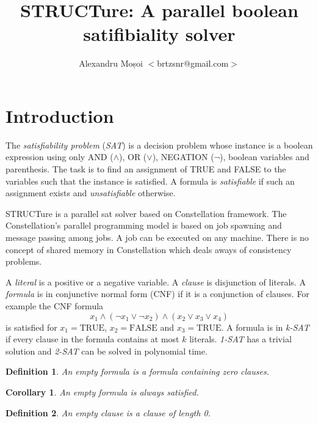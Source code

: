 \documentclass[12pt]{article}
\newtheorem{definition}{Definition}
\newtheorem{corollary}{Corollary}
\newcommand{\T}{\text{TRUE}}
\newcommand{\F}{\text{FALSE}}
\begin{document}
\title{STRUCTure: A parallel boolean satifibiality solver}
\author{Alexandru Moșoi $<$brtzsnr@gmail.com$>$}
\maketitle

\begin{abstract}
\end{abstract}

\section{Introduction}

The \emph{satisfiability problem} (\emph{SAT}) is a decision problem whose instance is a boolean
expression using only AND ($\land$), OR ($\lor$), NEGATION ($\neg$), boolean variables and
parenthesis. The task is to find an assignment of TRUE and FALSE to the variables such that
the instance is satisfied. A formula is \emph{satisfiable} if such an assignment exists and
\emph{unsatisfiable} otherwise.

STRUCTure is a parallel sat solver based on Constellation framework. The Constellation's
parallel programming model is based on job spawning and message passing among jobs.  A job can
be executed on any machine. There is no concept of shared memory in Constellation which deals
aways of consistency problems.

A \emph{literal} is a positive or a negative variable. A \emph{clause} is disjunction of literals.
A \emph{formula} is in conjunctive normal form (CNF) if it is a conjunction of clauses. For
example the CNF formula
\[
x_1 \land (\neg x_1 \lor \neg x_2) \land (x_2 \lor x_3 \lor x_4)
\]
is satisfied for $x_1 = \T$, $x_2 = \F$ and $x_3 = \text{TRUE}$. A formula is in \emph{k-SAT}
if every clause in the formula contains at most $k$ literals. \emph{1-SAT} has a trivial solution
and \emph{2-SAT} can be solved in polynomial time.

\begin{definition}
An \emph{empty formula} is a formula containing zero clauses.
\end{definition}

\begin{corollary}
An \emph{empty formula} is always satisfied.
\end{corollary}

\begin{definition}
An \emph{empty clause} is a clause of length 0.
\end{definition}
\end{document}
